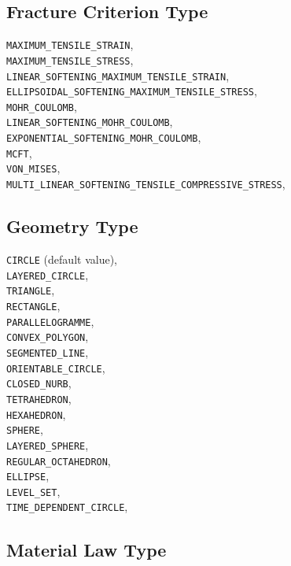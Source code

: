 \documentclass[10pt]{article}
\begin{document}
\subsection{Fracture Criterion Type}

\verb+MAXIMUM_TENSILE_STRAIN+,\\
\verb+MAXIMUM_TENSILE_STRESS+,\\
\verb+LINEAR_SOFTENING_MAXIMUM_TENSILE_STRAIN+,\\
\verb+ELLIPSOIDAL_SOFTENING_MAXIMUM_TENSILE_STRESS+,\\
\verb+MOHR_COULOMB+,\\
\verb+LINEAR_SOFTENING_MOHR_COULOMB+,\\
\verb+EXPONENTIAL_SOFTENING_MOHR_COULOMB+,\\
\verb+MCFT+,\\
\verb+VON_MISES+,\\
\verb+MULTI_LINEAR_SOFTENING_TENSILE_COMPRESSIVE_STRESS+,


\subsection{Geometry Type}

\verb+CIRCLE+ (default value),\\
\verb+LAYERED_CIRCLE+,\\
\verb+TRIANGLE+,\\
\verb+RECTANGLE+,\\
\verb+PARALLELOGRAMME+,\\
\verb+CONVEX_POLYGON+,\\
\verb+SEGMENTED_LINE+,\\
\verb+ORIENTABLE_CIRCLE+,\\
\verb+CLOSED_NURB+,\\
\verb+TETRAHEDRON+,\\
\verb+HEXAHEDRON+,\\
\verb+SPHERE+,\\
\verb+LAYERED_SPHERE+,\\
\verb+REGULAR_OCTAHEDRON+,\\
\verb+ELLIPSE+,\\
\verb+LEVEL_SET+,\\
\verb+TIME_DEPENDENT_CIRCLE+,\\

\subsection{Material Law Type}
\end{document}

